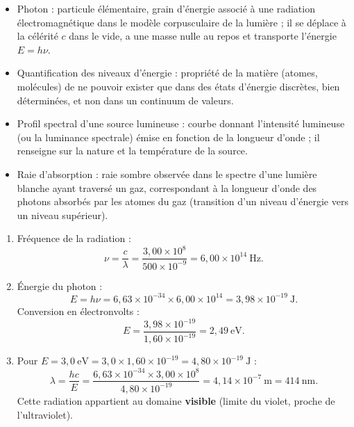 \documentclass[11pt]{article}
\newcommand{\cle}[1]{{\popxbold\color{popdark}#1}}
\newcounter{popsec}
\newcounter{popsub}
\newcommand{\courssub}[1]{%
  \stepcounter{popsub}%
  \par\vspace{9pt}\noindent{\popxbold\fontsize{11.5}{13}\selectfont\color{popink}{\color{poporange}\thepopsec.\thepopsub}\hspace{6pt}#1}\par\nopagebreak\vspace{4pt}
}
\begin{document}
\begin{corrige}
\begin{itemize}
\item \cle{Photon} : particule élémentaire, grain d'énergie associé à une radiation électromagnétique dans le modèle corpusculaire de la lumière ; il se déplace à la célérité $c$ dans le vide, a une masse nulle au repos et transporte l'énergie $E = h\nu$.
\item \cle{Quantification} des niveaux d'énergie : propriété de la matière (atomes, molécules) de ne pouvoir exister que dans des états d'énergie discrètes, bien déterminées, et non dans un continuum de valeurs.
\item \cle{Profil spectral} d'une source lumineuse : courbe donnant l'intensité lumineuse (ou la luminance spectrale) émise en fonction de la longueur d'onde ; il renseigne sur la nature et la température de la source.
\item \cle{Raie d'absorption} : raie sombre observée dans le spectre d'une lumière blanche ayant traversé un gaz, correspondant à la longueur d'onde des photons absorbés par les atomes du gaz (transition d'un niveau d'énergie vers un niveau supérieur).
\end{itemize}
\end{corrige}

\begin{corrige}
\begin{enumerate}
\item Fréquence de la radiation :
\[ \nu = \frac{c}{\lambda} = \frac{3,00\times10^8}{500\times10^{-9}} = 6,00\times10^{14}\ \mathrm{Hz}. \]
\item Énergie du photon :
\[ E = h\nu = 6,63\times10^{-34}\times6,00\times10^{14} = 3,98\times10^{-19}\ \mathrm{J}. \]
Conversion en électronvolts :
\[ E = \frac{3,98\times10^{-19}}{1,60\times10^{-19}} = 2,49\ \mathrm{eV}. \]
\item Pour $E = 3,0\ \mathrm{eV} = 3,0\times1,60\times10^{-19} = 4,80\times10^{-19}\ \mathrm{J}$ :
\[ \lambda = \frac{hc}{E} = \frac{6,63\times10^{-34}\times3,00\times10^8}{4,80\times10^{-19}} = 4,14\times10^{-7}\ \mathrm{m} = 414\ \mathrm{nm}. \]
Cette radiation appartient au domaine \textbf{visible} (limite du violet, proche de l'ultraviolet).
\end{enumerate}
\end{corrige}

\courssub{Je m'entraîne}
\end{document}
